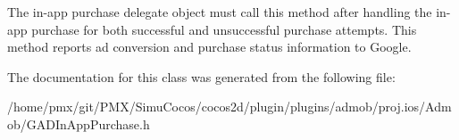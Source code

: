 The in-\/app purchase delegate object must call this method after handling the in-\/app purchase for both successful and unsuccessful purchase attempts. This method reports ad conversion and purchase status information to Google. 

The documentation for this class was generated from the following file\+:\begin{DoxyCompactItemize}
\item 
/home/pmx/git/\+P\+M\+X/\+Simu\+Cocos/cocos2d/plugin/plugins/admob/proj.\+ios/\+Admob/G\+A\+D\+In\+App\+Purchase.\+h\end{DoxyCompactItemize}

